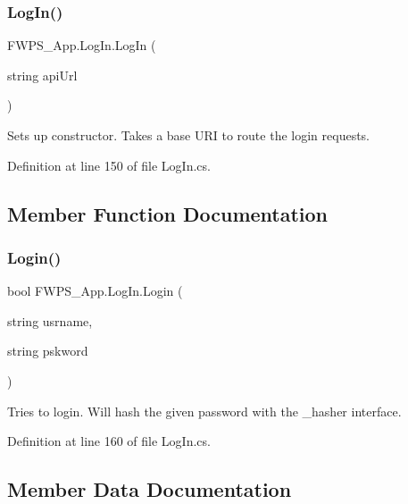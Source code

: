 \subsubsection{\texorpdfstring{Log\+In()}{LogIn()}}
{\footnotesize\ttfamily F\+W\+P\+S\+\_\+\+App.\+Log\+In.\+Log\+In (\begin{DoxyParamCaption}\item[{string}]{api\+Url }\end{DoxyParamCaption})}

Sets up constructor. Takes a base U\+RI to route the login requests. 

Definition at line 150 of file Log\+In.\+cs.



\subsection{Member Function Documentation}
\mbox{\label{class_f_w_p_s___app_1_1_log_in_ab71c428971eb55052a152e6e7e5be0bf}} 
\subsubsection{\texorpdfstring{Login()}{Login()}}
{\footnotesize\ttfamily bool F\+W\+P\+S\+\_\+\+App.\+Log\+In.\+Login (\begin{DoxyParamCaption}\item[{string}]{usrname,  }\item[{string}]{pskword }\end{DoxyParamCaption})}

Tries to login. Will hash the given password with the \+\_\+hasher interface. 

Definition at line 160 of file Log\+In.\+cs.



\subsection{Member Data Documentation}
\mbox{\label{class_f_w_p_s___app_1_1_log_in_a77038778855a35ff0cb47797e8c17b38}} 
